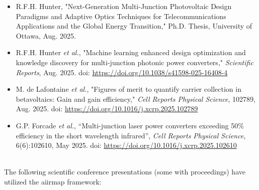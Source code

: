 \documentclass[a4paper,12pt,english]{article}
\begin{document}
     \begin{itemize}
         \item R.F.H. Hunter, "Next-Generation Multi-Junction Photovoltaic Design Paradigms and Adaptive Optics Techniques for Telecommunications Applications and the Global Energy Transition," Ph.D. Thesis, University of Ottawa, Aug. 2025. 
         \item R.F.H. Hunter \textit{et al.}, "Machine learning enhanced design optimization and knowledge discovery for multi-junction photonic power converters," \textit{Scientific Reports}, Aug. 2025. doi: \url{https://doi.org/10.1038/s41598-025-16408-4} 
         \item M. de Lafontaine \textit{et al.}, "Figures of merit to quantify carrier collection in betavoltaics: Gain and gain efficiency," \textit{Cell Reports Physical Science}, 102789, Aug. 2025. doi: \url{https://doi.org/10.1016/j.xcrp.2025.102789} 
         \item G.P. Forcade \textit{et al.}, “Multi-junction laser power converters exceeding 50\% efficiency in the short wavelength infrared”, \textit{Cell Reports Physical Science}, 6(6):102610, May 2025. doi: \url{https://doi.org/10.1016/j.xcrp.2025.102610}
     \end{itemize}\\

    \noindent
     The following scientific conference presentations (some with proceedings) have utilized the aiirmap framework:
\end{document}
